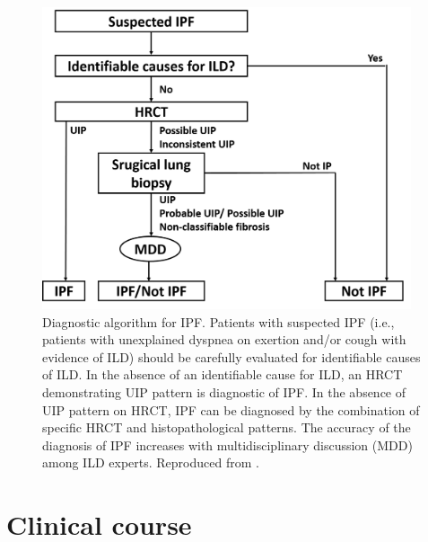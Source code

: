 \begin{figure}[htbp]
  \centering 
  \includegraphics[height=3.5in]{Background/Image/IPFDiagnosis.png}
  \caption{Diagnostic algorithm for IPF. Patients with suspected IPF (i.e., patients with unexplained dyspnea on exertion and/or cough with evidence of ILD) should be carefully evaluated for identifiable causes of ILD. In the absence of an identifiable cause for ILD, an HRCT demonstrating UIP pattern is diagnostic of IPF. In the absence of UIP pattern on HRCT, IPF can be diagnosed by the combination of specific HRCT and histopathological patterns. The accuracy of the diagnosis of IPF increases with multidisciplinary discussion (MDD) among ILD experts. Reproduced from \citep{raghu2011official}.}
  \label{fig:IPFDiagnosis}
\end{figure}

\section{Clinical course} 


